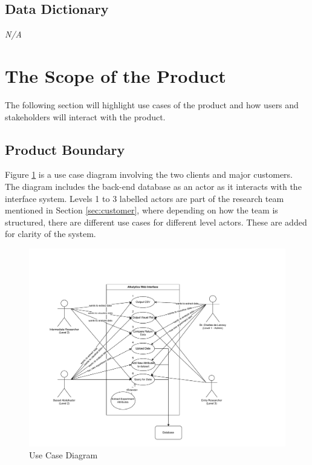 \documentclass[12pt]{article}
\begin{document}
\subsection{Data Dictionary}
\emph{N/A}

\section{The Scope of the Product}
The following section will highlight use cases of the product and how users and
stakeholders will interact with the product.  
\subsection{Product Boundary}
Figure \ref{UCD} is a use case diagram involving the two clients and major customers. The
diagram includes the back-end database as an actor as it interacts with the
interface system. Levels 1 to 3 labelled actors are part of the research team
mentioned in Section \ref{sec:customer}, where depending on how the team is structured,
there are different use cases for different level actors. These are added for
clarity of the system.
\begin{figure}[H]
  \centering
  \includegraphics[scale=0.6]{./Diagrams/useCase.pdf}
  \caption{Use Case Diagram}
  \label{UCD}
\end{figure}
\end{document}
